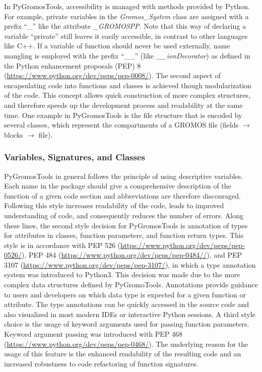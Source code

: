 In PyGromosTools, accessibility is managed with methods provided by Python. For example, private variables in the \textit{Gromos\_System} class are assigned with a prefix ``\_'' like the attribute \textit{\_GROMOSPP}. Note that this way of declaring a variable ``private'' still leaves it easily accessible, in contrast to other languages like C++\cite{Stroustrup1995}. If a variable of function should never be used externally, name mangling is employed with the prefix ``\_\_'' (like \textit{\_\_ionDecorator}) as defined in the Python enhancement proposals (PEP) 8 (\url{https://www.python.org/dev/peps/pep-0008/}).
The second aspect of encapsulating code into functions and classes is achieved though modularization of the code. This concept allows quick construction of more complex structures, and therefore speeds up the development process and readability at the same time.\cite{Ganney2020}
One example in PyGromosTools is the file structure that is encoded by several classes, which represent the compartments of a GROMOS file (fields $\rightarrow$ blocks $\rightarrow$ file).

\subsubsection{Variables, Signatures, and Classes}
PyGromosTools in general follows the principle of using descriptive variables. Each name in the package should give a comprehensive description of the function of a given code section and abbreviations are therefore discouraged. Following this style increases readability of the code, leads to improved understanding of code, and consequently reduces the number of errors. Along these lines, the second style decision for PyGromosTools is annotation of types for attributes in classes, function parameters, and function return types. This style is in accordance with PEP 526 (\url{https://www.python.org/dev/peps/pep-0526/}), PEP 484 (\url{https://www.python.org/dev/peps/pep-0484//}), and PEP 3107 (\url{https://www.python.org/dev/peps/pep-3107/}), in which a type annotation system was introduced to Python3. This decision was made due to the more complex data structures defined by PyGromoTools. Annotations provide guidance to users and developers on which data type is expected for a given function or attribute. The type annotations can be quickly accessed in the source code and also visualized in most modern IDEs or interactive Python sessions. A third style choice is the usage of keyword arguments used for passing function parameters. Keyword argument passing was introduced with PEP 468 (\url{https://www.python.org/dev/peps/pep-0468/}). The underlying reason for the usage of this feature is the enhanced readability of the resulting code and an increased robustness to code refactoring of function signatures.

